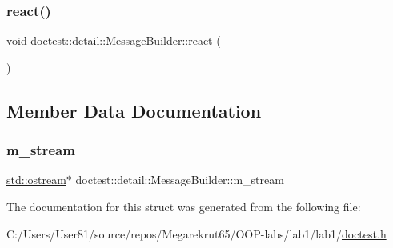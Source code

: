 \mbox{\label{structdoctest_1_1detail_1_1_message_builder_a3a65c5e39a0c04ae8e2a7c34997a2e4d}} 
\subsubsection{\texorpdfstring{react()}{react()}}
{\footnotesize\ttfamily void doctest\+::detail\+::\+Message\+Builder\+::react (\begin{DoxyParamCaption}{ }\end{DoxyParamCaption})}



\subsection{Member Data Documentation}
\mbox{\label{structdoctest_1_1detail_1_1_message_builder_a5319d522ba62c91e59ffa7f6982756e5}} 
\subsubsection{\texorpdfstring{m\+\_\+stream}{m\_stream}}
{\footnotesize\ttfamily \mbox{\hyperlink{doctest_8h_a116af65cb5e924b33ad9d9ecd7a783f3}{std\+::ostream}}$\ast$ doctest\+::detail\+::\+Message\+Builder\+::m\+\_\+stream}



The documentation for this struct was generated from the following file\+:\begin{DoxyCompactItemize}
\item 
C\+:/\+Users/\+User81/source/repos/\+Megarekrut65/\+O\+O\+P-\/labs/lab1/lab1/\mbox{\hyperlink{doctest_8h}{doctest.\+h}}\end{DoxyCompactItemize}
